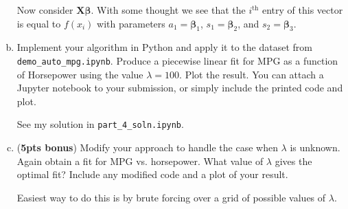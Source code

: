 \documentclass[10pt]{article}
\newcommand{\bs}[1]{\boldsymbol{#1}}
\newcommand{\bv}[1]{\mathbf{#1}}
\begin{document}
\begin{enumerate}[(a)]
	Now consider $\bv{X}\bs{\beta}$. With some thought we see that the $i^\text{th}$ entry of this vector is equal to $f(x_i)$ with parameters $a_1 = \bs{\beta}_1$, $s_1 = \bs{\beta}_2$, and $s_2 = \bs{\beta}_3$.
	\color{black}
	
	\item Implement your algorithm in Python and apply it to the dataset from \texttt{demo\_auto\_mpg.ipynb}. Produce a piecewise linear fit for MPG as a function of Horsepower using the value $\lambda = 100$. Plot the result. You can attach a Jupyter notebook to your submission, or simply include the printed code and plot. 
	
	\color{blue}
	See my solution in \texttt{part\_4\_soln.ipynb}.
	\color{black}
	
	\item (\textbf{5pts bonus}) Modify your approach to handle the case when $\lambda$ is unknown. Again obtain a fit for MPG vs. horsepower. What value of $\lambda$ gives the optimal fit? Include any modified code and a plot of your result.
	
	\color{blue}
	Easiest way to do this is by brute forcing over a grid of possible values of $\lambda$. 
	\color{black}
\end{enumerate}
\end{document}
